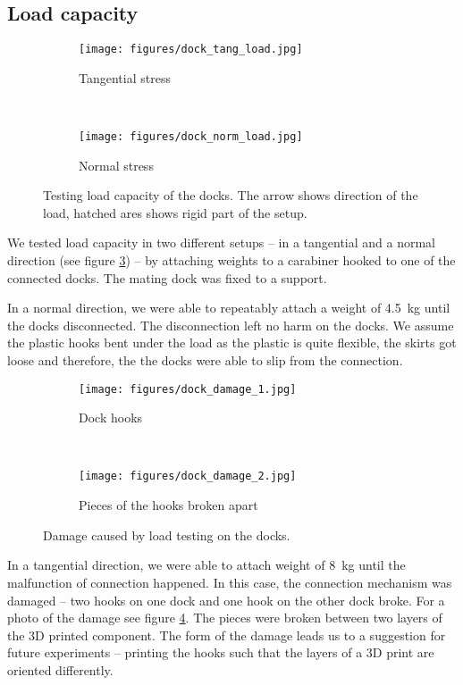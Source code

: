 \subsection{Load capacity}

\begin{figure}[t!]
    \centering
    \begin{subfigure}[b]{0.45\textwidth}
        \texttt{[image: figures/dock\_tang\_load.jpg]}
        \caption{Tangential stress}
        \label{fig:dock_test_tang}
    \end{subfigure}
    ~
    \begin{subfigure}[b]{0.45\textwidth}
        \texttt{[image: figures/dock\_norm\_load.jpg]}
        \caption{Normal stress}
        \label{fig:dock_test_norm}
    \end{subfigure}
    \caption{Testing load capacity of the docks. The arrow shows direction of
    the load, hatched ares shows rigid part of the setup.}
    \label{fig:dock_test_load}
\end{figure}

We tested load capacity in two different setups -- in a tangential and a normal
direction (see figure \ref{fig:dock_test_load}) -- by attaching weights to a
carabiner hooked to one of the connected docks. The mating dock was fixed to a
support.

In a normal direction, we were able to repeatably attach a weight of 4.5~kg
until the docks disconnected. The disconnection left no harm on the docks. We
assume the plastic hooks bent under the load as the plastic is quite flexible,
the skirts got loose and therefore, the the docks were able to slip from the
connection.

\begin{figure}[t!]
    \centering
    \begin{subfigure}[b]{0.45\textwidth}
        \texttt{[image: figures/dock\_damage\_1.jpg]}
        \caption{Dock hooks}
    \end{subfigure}
    ~
    \begin{subfigure}[b]{0.45\textwidth}
        \texttt{[image: figures/dock\_damage\_2.jpg]}
        \caption{Pieces of the hooks broken apart}
    \end{subfigure}
    \caption{Damage caused by load testing on the docks.}
    \label{fig:dock_damage}
\end{figure}

In a tangential direction, we were able to attach weight of 8~kg until the
malfunction of connection happened. In this case, the connection mechanism was
damaged -- two hooks on one dock and one hook on the other dock broke. For a
photo of the damage see figure \ref{fig:dock_damage}. The pieces were broken
between two layers of the 3D printed component. The form of the damage leads us
to a suggestion for future experiments -- printing the hooks such that the
layers of a 3D print are oriented differently.


